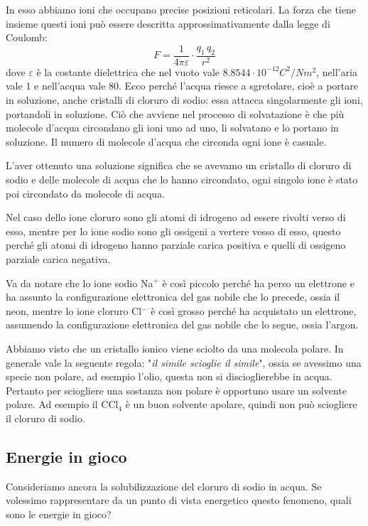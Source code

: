 In esso abbiamo ioni che occupano precise posizioni reticolari. La forza che tiene insieme questi ioni può essere descritta approssimativamente dalla legge di Coulomb:
$$\displaystyle F= \frac{1}{4 \pi \varepsilon} \cdot \frac{q_1 \, q_2}{r^2}$$
dove $\varepsilon$ è la costante dielettrica che nel vuoto vale $8.8544 \cdot 10^{-12} C^2/Nm^2$, nell'aria vale 1 e nell'acqua vale 80. Ecco perché l'acqua riesce a sgretolare, cioè a portare in soluzione, anche cristalli di cloruro di sodio: essa attacca singolarmente gli ioni, portandoli in soluzione. Ciò che avviene nel processo di solvatazione è che più molecole d'acqua circondano gli ioni uno ad uno, li solvatano e lo portano in soluzione. Il numero di molecole d'acqua che circonda ogni ione è casuale.

L'aver ottenuto una soluzione significa che se avevamo un cristallo di cloruro di sodio e delle molecole di acqua che lo hanno circondato, ogni singolo ione è stato poi circondato da molecole di acqua.

Nel caso dello ione cloruro sono gli atomi di idrogeno ad essere rivolti verso di esso, mentre per lo ione sodio sono gli ossigeni a vertere vesso di esso, questo perché gli atomi di idrogeno hanno parziale carica positiva e quelli di ossigeno parziale carica negativa.

Va da notare che lo ione sodio Na$^+$ è così piccolo perché ha perso un elettrone e ha assunto la configurazione elettronica del gas nobile che lo precede, ossia il neon, mentre lo ione cloruro Cl$^-$ è così grosso perché ha acquistato un elettrone, assumendo la configurazione elettronica del gas nobile che lo segue, ossia l'argon.

\vspace{0.2cm}Abbiamo visto che un cristallo ionico viene sciolto da una molecola polare. In generale vale la seguente regola: "\textit{il simile scioglie il simile}", ossia se avessimo una specie non polare, ad esempio l'olio, questa non si discioglierebbe in acqua. Pertanto per sciogliere una sostanza non polare è opportuno usare un solvente polare. Ad esempio il CCl$_4$ è un buon solvente apolare, quindi non può sciogliere il cloruro di sodio.

\subsection{Energie in gioco}

Consideriamo ancora la solubilizzazione del cloruro di sodio in acqua. Se volessimo rappresentare da un punto di vista energetico questo fenomeno, quali sono le energie in gioco?

